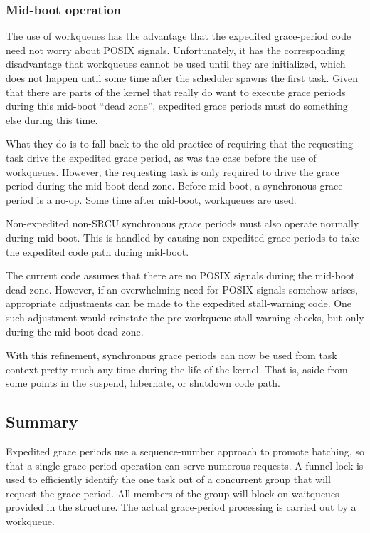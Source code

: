 \subsubsection{Mid-boot operation}

The use of workqueues has the advantage that the expedited grace-period
code need not worry about POSIX signals.
Unfortunately, it has the
corresponding disadvantage that workqueues cannot be used until they are
initialized, which does not happen until some time after the scheduler
spawns the first task.
Given that there are parts of the kernel that
really do want to execute grace periods during this mid-boot ``dead
zone'', expedited grace periods must do something else during this time.

What they do is to fall back to the old practice of requiring that the
requesting task drive the expedited grace period, as was the case before
the use of workqueues.
However, the requesting task is only required to
drive the grace period during the mid-boot dead zone.
Before mid-boot, a
synchronous grace period is a no-op. Some time after mid-boot,
workqueues are used.

Non-expedited non-SRCU synchronous grace periods must also operate
normally during mid-boot.
This is handled by causing non-expedited grace
periods to take the expedited code path during mid-boot.

The current code assumes that there are no POSIX signals during the
mid-boot dead zone.
However, if an overwhelming need for POSIX signals
somehow arises, appropriate adjustments can be made to the expedited
stall-warning code.
One such adjustment would reinstate the
pre-workqueue stall-warning checks, but only during the mid-boot dead
zone.

With this refinement, synchronous grace periods can now be used from
task context pretty much any time during the life of the kernel.
That
is, aside from some points in the suspend, hibernate, or shutdown code
path.

\subsection{Summary}

Expedited grace periods use a sequence-number approach to promote
batching, so that a single grace-period operation can serve numerous
requests.
A funnel lock is used to efficiently identify the one task out
of a concurrent group that will request the grace period.
All members of
the group will block on waitqueues provided in the 
structure.
The actual grace-period processing is carried out by a
workqueue.

